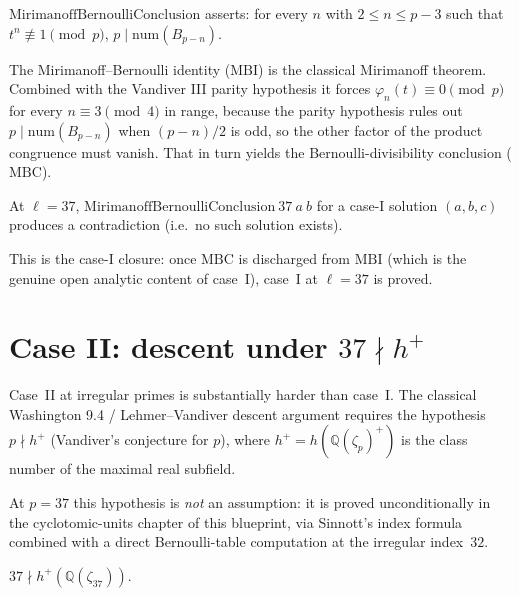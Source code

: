 \begin{definition}
  \label{def:mirimanoffBernoulliConclusion}
  \leanok
  $\mathrm{MirimanoffBernoulliConclusion}$ asserts: for every $n$ with
  $2 \le n \le p - 3$ such that $t^n \not\equiv 1 \pmod p$,
  $p \mid \mathrm{num}(B_{p-n})$.
\end{definition}

The Mirimanoff--Bernoulli identity ($\mathrm{MBI}$) is the classical
Mirimanoff theorem.  Combined with the Vandiver III parity hypothesis it
forces $\varphi_n(t) \equiv 0 \pmod p$ for every $n \equiv 3 \pmod 4$ in
range, because the parity hypothesis rules out
$p \mid \mathrm{num}(B_{p-n})$ when $(p-n)/2$ is odd, so the other factor
of the product congruence must vanish.  That in turn yields the
Bernoulli-divisibility conclusion ($\mathrm{MBC}$).

\begin{theorem}
  \label{thm:caseI_thirtyseven_of_bernoulli_conclusion}
  \leanok
  At $\ell = 37$, $\mathrm{MirimanoffBernoulliConclusion}\ 37\ a\ b$ for a
  case-I solution $(a,b,c)$ produces a contradiction (i.e.\ no such
  solution exists).
\end{theorem}

This is the case-I closure: once $\mathrm{MBC}$ is discharged from
$\mathrm{MBI}$ (which is the genuine open analytic content of case~I),
case~I at $\ell = 37$ is proved.

\section{Case II: descent under $37 \nmid h^+$}

Case~II at irregular primes is substantially harder than case~I.  The
classical Washington 9.4 / Lehmer--Vandiver descent argument requires
the hypothesis $p \nmid h^+$ (Vandiver's conjecture for $p$), where
$h^+ = h(\mathbb Q(\zeta_p)^+)$ is the class number of the maximal real
subfield.

At $p = 37$ this hypothesis is \emph{not} an assumption: it is proved
unconditionally in the cyclotomic-units chapter of this blueprint, via
Sinnott's index formula combined with a direct Bernoulli-table
computation at the irregular index~$32$.

\begin{theorem}
  \label{thm:lehmer_vandiver_not_dvd_hPlus}
  \leanok
  $37 \nmid h^+(\mathbb Q(\zeta_{37}))$.
\end{theorem}

